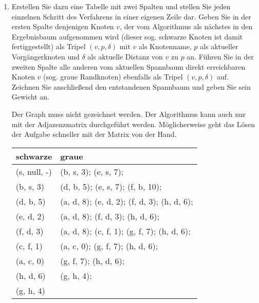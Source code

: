 \documentclass{bschlangaul-aufgabe}
\begin{document}
\begin{enumerate}
\item Erstellen Sie dazu eine Tabelle mit zwei Spalten und stellen Sie
jeden einzelnen Schritt des Verfahrens in einer eigenen Zeile dar. Geben
Sie in der ersten Spalte denjenigen Knoten $v$, der vom Algorithmus als
nächstes in den Ergebnisbaum aufgenommen wird (dieser sog. schwarze
Knoten ist damit fertiggestellt) als Tripel $(v, p, \delta)$ mit $v$ als
Knotenname, $p$ als aktueller Vorgängerknoten und $\delta$ als aktuelle
Distanz von $v$ zu $p$ an. Führen Sie in der zweiten Spalte alle anderen
vom aktuellen Spannbaum direkt erreichbaren Knoten $v$ (sog. graue
Randknoten) ebenfalls als Tripel $(v, p, \delta)$ auf. Zeichnen Sie
anschließend den entstandenen Spannbaum und geben Sie sein Gewicht an.

\begin{bAntwort}
Der Graph muss nicht gezeichnet werden. Der Algorithmus kann auch nur
mit der Adjazenzmatrix durchgeführt werden. Möglicherweise geht das
Lösen der Aufgabe schneller mit der Matrix von der Hand.


\begin{center}
\end{center}


\begin{tabular}{ll}
\bf{schwarze} & \bf{graue} \\
\hline
(s, null, -) & (b, s, 3); (e, s, 7);  \\
(b, s, 3) & (d, b, 5); (e, s, 7); (f, b, 10);  \\
(d, b, 5) & (a, d, 8); (e, d, 2); (f, d, 3); (h, d, 6);  \\
(e, d, 2) & (a, d, 8); (f, d, 3); (h, d, 6);  \\
(f, d, 3) & (a, d, 8); (c, f, 1); (g, f, 7); (h, d, 6);  \\
(c, f, 1) & (a, c, 0); (g, f, 7); (h, d, 6);  \\
(a, c, 0) & (g, f, 7); (h, d, 6);  \\
(h, d, 6) & (g, h, 4);  \\
(g, h, 4) &   \\
\end{tabular}


\end{bAntwort}
\end{enumerate}
\end{document}
